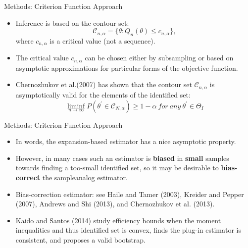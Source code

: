 \documentclass[aspectratio=169]{beamer}  %
\begin{document}
\begin{frame}{Methods: Criterion Function Approach}
    \begin{itemize}
        \item Inference is based on the contour set: $$\mathcal{C}_{n,\alpha} = \{\theta: Q_n(\theta) \leq c_{n,\alpha}\},$$ where $c_{n,\alpha}$ is a critical value (not a sequence).
        \item The critical value $c_{n,\alpha}$ can be chosen either by subsampling or based on asymptotic approximations for particular forms of the objective function.
        \item Chernozhukov et al.(2007) has shown that the contour set $\mathcal{C}_{n,\alpha}$ is asymptotically valid for the elements of the identified set: $$\liminf_{n\to\infty}P(\theta^{\prime}\in\mathcal{C}_{N,\alpha})\geq1-\alpha~for~any~\theta^{\prime}\in\Theta_I$$
    \end{itemize}
\end{frame}

\begin{frame}{Methods: Criterion Function Approach}
    \begin{itemize}
        \item In words, the expansion-based estimator has a nice asymptotic property.
        \item However, in many cases such an estimator is \textbf{biased} in \textbf{small} samples towards finding a too-small identified set, so it may be desirable to \textbf{bias-correct} the sampleanalog estimator.
        \item Bias-correction estimator: see Haile and Tamer (2003), Kreider and Pepper (2007), Andrews and Shi (2013), and Chernozhukov et al. (2013).
        \item Kaido and Santos (2014) study efficiency bounds when the moment inequalities and thus identified set is convex, finds the plug-in estimator is consistent, and proposes a valid bootstrap.
    \end{itemize}
\end{frame}
\end{document}
